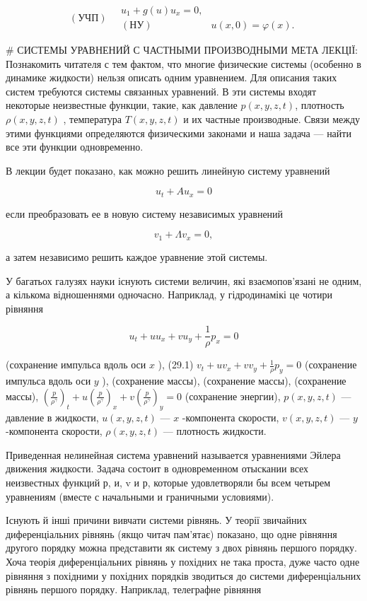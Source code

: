 \documentclass[
  ukrainian,
]{article}
\begin{document}
\[
(\text{УЧП}) \quad \begin{array}{ll} u_1 + g(u) u_x = 0, \\ (\text{НУ}) & u(x, 0) = \varphi(x). \end{array}
\]

\# СИСТЕМЫ УРАВНЕНИЙ С ЧАСТНЫМИ ПРОИЗВОДНЫМИ МЕТА ЛЕКЦІЇ: Познакомить
читателя с тем фактом, что многие физические системы (особенно в
динамике жидкости) нельзя описать одним уравнением. Для описания таких
систем требуются системы связанных уравнений. В эти системы входят
некоторые неизвестные функции, такие, как давление \(p(x, y, z, t)\),
плотность \(\rho(x, y, z, t)\) , температура \(T(x, y, z, t)\) и их
частные производные. Связи между этими функциями определяются
физическими законами и наша задача --- найти все эти функции
одновременно.

В лекции будет показано, как можно решить линейную систему уравнений

\[
u_t + Au_x = 0
\]

если преобразовать ее в новую систему независимых уравнений

\[
v_1 + \Lambda v_x = 0,
\]

а затем независимо решить каждое уравнение этой системы.

У багатьох галузях науки існують системи величин, які взаємопов'язані не
одним, а кількома відношеннями одночасно. Наприклад, у гідродинамікі це
чотири рівняння

\[
u_t + uu_x + vu_y + \frac{1}{\rho} p_x = 0
\]

(сохранение импульса вдоль оси \(x\) ), (29.1)
\(v_t + uv_x + vv_y + \frac{1}{\rho} p_y = 0\) (сохранение импульса
вдоль оси \(y\) ), (сохранение массы), (сохранение массы), (сохранение
массы),
\(\left(\frac{p}{\rho^{\gamma}}\right)_t + u\left(\frac{p}{\rho^{\gamma}}\right)_x + v\left(\frac{p}{\rho^{\gamma}}\right)_y = 0\)
(сохранение энергии), \(p(x, y, z, t)\) --- давление в жидкости,
\(u(x, y, z, t)\) --- \(x\) -компонента скорости, \(v(x, y, z, t)\) ---
\(y\) -компонента скорости, \(\rho(x, y, z, t)\) --- плотность жидкости.

Приведенная нелинейная система уравнений называется уравнениями Эйлера
движения жидкости. Задача состоит в одновременном отыскании всех
неизвестных функций р, и, v и р, которые удовлетворяли бы всем четырем
уравнениям (вместе с начальными и граничными условиями).

Існують й інші причини вивчати системи рівнянь. У теорії звичайних
диференціальних рівнянь (якщо читач пам'ятає) показано, що одне рівняння
другого порядку можна представити як систему з двох рівнянь першого
порядку. Хоча теорія диференціальних рівнянь у похідних не така проста,
дуже часто одне рівняння з похідними у похідних порядків зводиться до
системи диференціальних рівнянь першого порядку. Наприклад, телеграфне
рівняння
\end{document}
